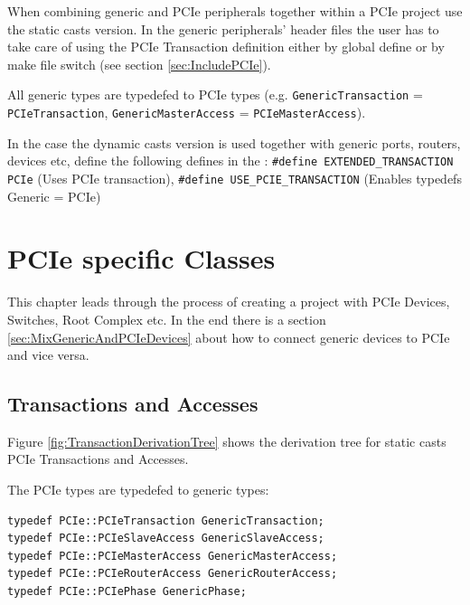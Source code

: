 When combining generic and PCIe peripherals together within a PCIe project use the static casts version. In the generic peripherals' header files the user has to take care of using the PCIe Transaction definition either by global define or by make file switch (see section \ref{sec:IncludePCIe}).

All generic types are typedefed to PCIe types (e.g. \lstinline|GenericTransaction| = \mbox{\lstinline|PCIeTransaction|,} \lstinline|GenericMasterAccess| = \lstinline|PCIeMasterAccess|).

In the case the dynamic casts version is used together with generic ports, routers, devices etc, define the following defines in the :
\lstinline[language=TeX]|#define EXTENDED_TRANSACTION PCIe| (Uses PCIe transaction), \lstinline[language=TeX]|#define USE_PCIE_TRANSACTION| (Enables typedefs Generic = PCIe)



\chapter{PCIe specific Classes}
\label{sec:PCIeSpecificClasses}

This chapter leads through the process of creating a project with PCIe Devices, Switches, Root Complex etc. In the end there is a section \ref{sec:MixGenericAndPCIeDevices} about how to connect generic devices to PCIe and vice versa.

\section{Transactions and Accesses}

Figure \ref{fig:TransactionDerivationTree} shows the derivation tree for static casts PCIe Transactions and Accesses.

The PCIe types are typedefed to generic types:
\begin{lstlisting}
typedef PCIe::PCIeTransaction GenericTransaction;
typedef PCIe::PCIeSlaveAccess GenericSlaveAccess;
typedef PCIe::PCIeMasterAccess GenericMasterAccess;
typedef PCIe::PCIeRouterAccess GenericRouterAccess;
typedef PCIe::PCIePhase GenericPhase;
\end{lstlisting}



